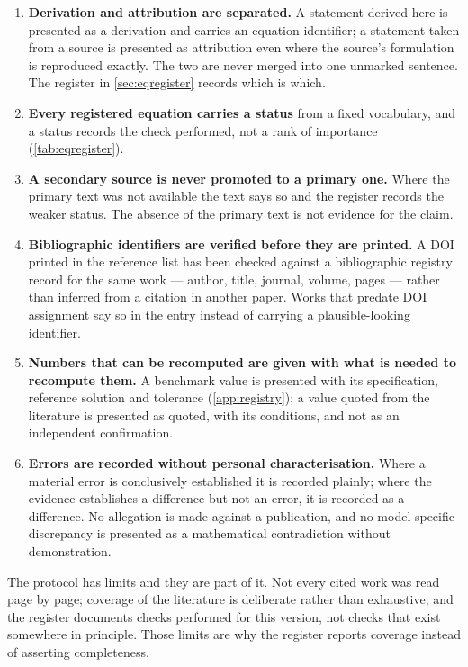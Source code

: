 \begin{enumerate}
\item \textbf{Derivation and attribution are separated.} A statement derived here is presented as a
derivation and carries an equation identifier; a statement taken from a source is presented as
attribution even where the source's formulation is reproduced exactly. The two are never merged into one
unmarked sentence. The register in \cref{sec:eqregister} records which is which.
\item \textbf{Every registered equation carries a status} from a fixed vocabulary, and a status records
the check performed, not a rank of importance (\cref{tab:eqregister}).
\item \textbf{A secondary source is never promoted to a primary one.} Where the primary text was not
available the text says so and the register records the weaker status. The absence of the primary text
is not evidence for the claim.
\item \textbf{Bibliographic identifiers are verified before they are printed.} A DOI printed in the
reference list has been checked against a bibliographic registry record for the same work --- author,
title, journal, volume, pages --- rather than inferred from a citation in another paper. Works that
predate DOI assignment say so in the entry instead of carrying a plausible-looking identifier.
\item \textbf{Numbers that can be recomputed are given with what is needed to recompute them.} A benchmark
value is presented with its specification, reference solution and tolerance
(\cref{app:registry}); a value quoted from the literature is presented as quoted, with its conditions,
and not as an independent confirmation.
\item \textbf{Errors are recorded without personal characterisation.} Where a material error is
conclusively established it is recorded plainly; where the evidence establishes a difference but not an
error, it is recorded as a difference. No allegation is made against a publication, and no model-specific
discrepancy is presented as a mathematical contradiction without demonstration.
\end{enumerate}

The protocol has limits and they are part of it. Not every cited work was read page by page; coverage of
the literature is deliberate rather than exhaustive; and the register documents checks performed for this
version, not checks that exist somewhere in principle. Those limits are why the register reports coverage
instead of asserting completeness.
